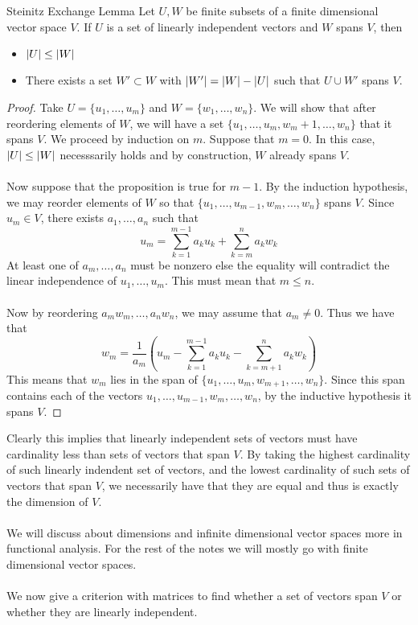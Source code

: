 \documentclass[a4paper]{article}
\begin{document}
\begin{thm}{Steinitz Exchange Lemma}{} Let $U,W$ be finite subsets of a finite dimensional vector space $V$. If $U$ is a set of linearly independent vectors and $W$ spans $V$, then 
\begin{itemize}
\item $\abs{U}\leq\abs{W}$
\item There exists a set $W'\subset W$ with $\abs{W'}=\abs{W}-\abs{U}$ such that $U\cup W'$ spans $V$. 
\end{itemize} \tcbline
\begin{proof}
Take $U=\{u_1,\dots,u_m\}$ and $W=\{w_1,\dots,w_n\}$. We will show that after reordering elements of $W$, we will have a set $\{u_1,\dots,u_m,w_m+1,\dots,w_n\}$ that it spans $V$. We proceed by induction on $m$. Suppose that $m=0$. In this case, $\abs{U}\leq\abs{W}$ necesssarily holds and by construction, $W$ already spans $V$. \\~\\
Now suppose that the proposition is true for $m-1$. By the induction hypothesis, we may reorder elements of $W$ so that $\{u_1,\dots,u_{m-1},w_m,\dots,w_n\}$ spans $V$. Since $u_m\in V$, there exists $a_1,\dots,a_n$ such that $$u_m=\sum_{k=1}^{m-1}a_ku_k+\sum_{k=m}^na_kw_k$$ At least one of $a_m,\dots,a_n$ must be nonzero else the equality will contradict the linear independence of $u_1,\dots,u_m$. This must mean that $m\leq n$. \\~\\
Now by reordering $a_mw_m,\dots,a_nw_n$, we may assume that $a_m\neq 0$. Thus we have that $$w_m=\frac{1}{a_m}\left(u_m-\sum_{k=1}^{m-1}a_ku_k-\sum_{k=m+1}^na_kw_k\right)$$ This means that $w_m$ lies in the span of $\{u_1,\dots,u_m,w_{m+1},\dots,w_n\}$. Since this span contains each of the vectors $u_1,\dots,u_{m-1},w_m,\dots,w_n$, by the inductive hypothesis it spans $V$. 
\end{proof}
\end{thm}

Clearly this implies that linearly independent sets of vectors must have cardinality less than sets of vectors that span $V$. By taking the highest cardinality of such linearly indendent set of vectors, and the lowest cardinality of such sets of vectors that span $V$, we necessarily have that they are equal and thus is exactly the dimension of $V$. \\~\\

We will discuss about dimensions and infinite dimensional vector spaces more in functional analysis. For the rest of the notes we will mostly go with finite dimensional vector spaces. \\~\\
We now give a criterion with matrices to find whether a set of vectors span $V$ or whether they are linearly independent. 
\end{document}
